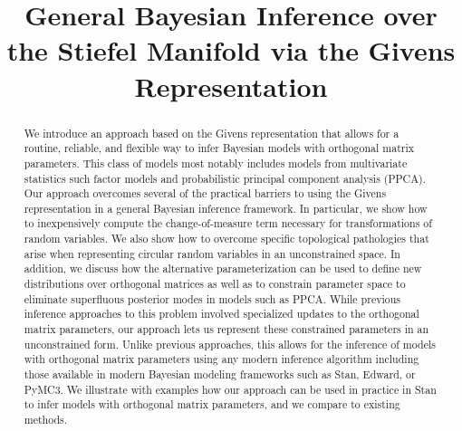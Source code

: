 \documentclass[ba]{imsart}
\numberwithin{equation}{section}
\theoremstyle{plain}
\begin{document}
\begin{frontmatter}
\title{General Bayesian Inference over the Stiefel Manifold via the Givens Representation}


\begin{abstract}
We introduce an approach based on the Givens representation that allows for a routine, reliable, and flexible way to infer Bayesian models with orthogonal matrix parameters. This class of models most notably includes models from multivariate statistics such factor models and probabilistic principal component analysis (PPCA). Our approach overcomes several of the practical barriers to using the Givens representation in a general Bayesian inference framework. In particular, we show how to inexpensively compute the change-of-measure term necessary for transformations of random variables. We also show how to overcome specific topological pathologies that arise when representing circular random variables in an unconstrained space. In addition, we discuss how the alternative parameterization can be used to define new distributions over orthogonal matrices as well as to constrain parameter space to eliminate superfluous posterior modes in models such as PPCA. While previous inference approaches to this problem involved specialized updates to the orthogonal matrix parameters, our approach lets us represent these constrained parameters in an unconstrained form. Unlike previous approaches, this allows for the inference of models with orthogonal matrix parameters using any modern inference algorithm including those available in modern Bayesian modeling frameworks such as Stan, Edward, or PyMC3. We illustrate with examples how our approach can be used in practice in Stan to infer models with orthogonal matrix parameters, and we compare to existing methods.
\end{abstract}

\begin{keyword}[class=MSC]
\end{keyword}

\begin{keyword}
\kwd{\LaTeXe}
\end{keyword}

\end{frontmatter}
\end{document}
